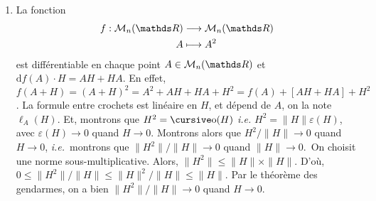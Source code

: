 \begin{exm}
	\begin{enumerate}
		\item La fonction
			\begin{align*}
				f: \mathcal{M}_n(\R) &\longrightarrow \mathcal{M}_n(\R) \\
				A &\longmapsto A^2
			\end{align*}
			est différentiable en chaque point $A \in \mathcal{M}_n(\R)$ et $\mathrm{d}f(A) \cdot H = AH + HA$.
			En effet, $f(A + H) = (A+H)^2 = A^2 + AH + HA + H^2 = f(A) + [AH + HA] + H^2$. La formule entre crochets est linéaire en $H$, et dépend de $A$, on la note $\ell_A(H)$.
			Et, montrons que $H^2 = \po(H)$ \textit{i.e.} $H^2 = \|H\| \varepsilon(H)$, avec $\varepsilon(H) \to 0$ quand $H \to 0$.
			Montrons alors que $H^2 / \|H\| \to 0$ quand $H \to 0$, \textit{i.e.}\ montrons que $\|H^2\| / \|H\| \to 0$ quand $\|H\|\to 0$.\footnotemark\ On choisit une norme sous-multiplicative. Alors, $\|H^2\| \le \|H\| \times \|H\|$. D'où, $0 \le \|H^2\| / \|H\| \le \|H\|^2 / \|H\| \le \|H\|$. Par le théorème des gendarmes, on a bien $\|H^2\|/ \|H\| \to 0$ quand $H \to 0$.
	\end{enumerate}
\end{exm}



